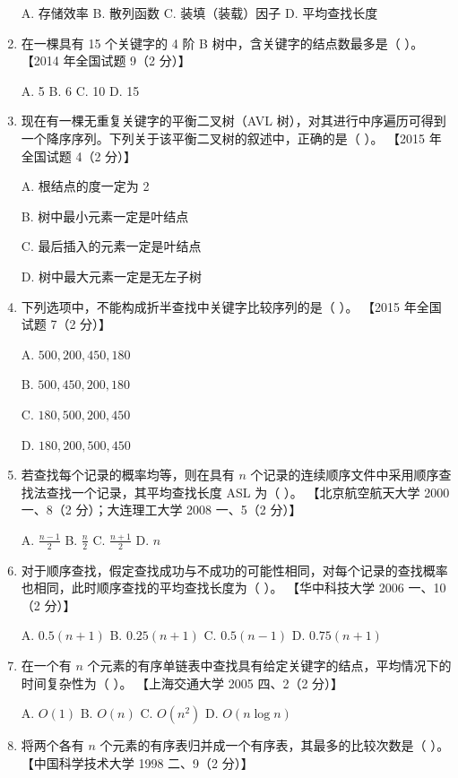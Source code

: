\documentclass[lang=cn,newtx,10pt,scheme=chinese]{../../elegantbook}
\begin{document}
\begin{enumerate}
    A. 存储效率 \quad B. 散列函数 \quad C. 装填（装载）因子 \quad D. 平均查找长度  

    \item 在一棵具有 15 个关键字的 4 阶 B 树中，含关键字的结点数最多是（ ）。  
    【2014 年全国试题 9（2 分）】  

    A. 5 \quad B. 6 \quad C. 10 \quad D. 15  

    \item 现在有一棵无重复关键字的平衡二叉树（AVL 树），对其进行中序遍历可得到一个降序序列。下列关于该平衡二叉树的叙述中，正确的是（ ）。  
    【2015 年全国试题 4（2 分）】  

    A. 根结点的度一定为 2  

    B. 树中最小元素一定是叶结点  

    C. 最后插入的元素一定是叶结点  

    D. 树中最大元素一定是无左子树  

    \item 下列选项中，不能构成折半查找中关键字比较序列的是（ ）。  
    【2015 年全国试题 7（2 分）】  

    A. $500, 200, 450, 180$  

    B. $500, 450, 200, 180$  

    C. $180, 500, 200, 450$  

    D. $180, 200, 500, 450$  

    \item 若查找每个记录的概率均等，则在具有 $n$ 个记录的连续顺序文件中采用顺序查找法查找一个记录，其平均查找长度 ASL 为（ ）。  
    【北京航空航天大学 2000 一、8（2 分）；大连理工大学 2008 一、5（2 分）】  

    A. $\frac{n-1}{2}$ \quad B. $\frac{n}{2}$ \quad C. $\frac{n+1}{2}$ \quad D. $n$  

    \item 对于顺序查找，假定查找成功与不成功的可能性相同，对每个记录的查找概率也相同，此时顺序查找的平均查找长度为（ ）。  
    【华中科技大学 2006 一、10（2 分）】  

    A. $0.5(n+1)$ \quad B. $0.25(n+1)$ \quad C. $0.5(n-1)$ \quad D. $0.75(n+1)$  

    \item 在一个有 $n$ 个元素的有序单链表中查找具有给定关键字的结点，平均情况下的时间复杂性为（ ）。  
    【上海交通大学 2005 四、2（2 分）】 

    A. $O(1)$ \quad B. $O(n)$ \quad C. $O(n^2)$ \quad D. $O(n \log n)$  

    \item 将两个各有 $n$ 个元素的有序表归并成一个有序表，其最多的比较次数是（ ）。  
    【中国科学技术大学 1998 二、9（2 分）】


\end{enumerate}
\end{document}
